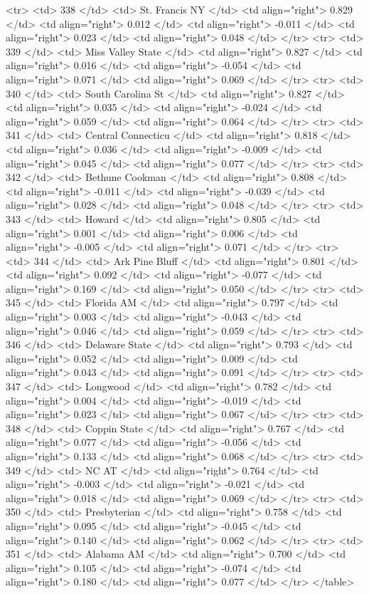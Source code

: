  <tr> <td> 338 </td> <td> St. Francis NY </td> <td align="right"> 0.829 </td> <td align="right"> 0.012 </td> <td align="right"> -0.011 </td> <td align="right"> 0.023 </td> <td align="right"> 0.048 </td> </tr>
  <tr> <td> 339 </td> <td> Miss Valley State </td> <td align="right"> 0.827 </td> <td align="right"> 0.016 </td> <td align="right"> -0.054 </td> <td align="right"> 0.071 </td> <td align="right"> 0.069 </td> </tr>
  <tr> <td> 340 </td> <td> South Carolina St </td> <td align="right"> 0.827 </td> <td align="right"> 0.035 </td> <td align="right"> -0.024 </td> <td align="right"> 0.059 </td> <td align="right"> 0.064 </td> </tr>
  <tr> <td> 341 </td> <td> Central Connecticu </td> <td align="right"> 0.818 </td> <td align="right"> 0.036 </td> <td align="right"> -0.009 </td> <td align="right"> 0.045 </td> <td align="right"> 0.077 </td> </tr>
  <tr> <td> 342 </td> <td> Bethune Cookman </td> <td align="right"> 0.808 </td> <td align="right"> -0.011 </td> <td align="right"> -0.039 </td> <td align="right"> 0.028 </td> <td align="right"> 0.048 </td> </tr>
  <tr> <td> 343 </td> <td> Howard </td> <td align="right"> 0.805 </td> <td align="right"> 0.001 </td> <td align="right"> 0.006 </td> <td align="right"> -0.005 </td> <td align="right"> 0.071 </td> </tr>
  <tr> <td> 344 </td> <td> Ark Pine Bluff </td> <td align="right"> 0.801 </td> <td align="right"> 0.092 </td> <td align="right"> -0.077 </td> <td align="right"> 0.169 </td> <td align="right"> 0.050 </td> </tr>
  <tr> <td> 345 </td> <td> Florida AM </td> <td align="right"> 0.797 </td> <td align="right"> 0.003 </td> <td align="right"> -0.043 </td> <td align="right"> 0.046 </td> <td align="right"> 0.059 </td> </tr>
  <tr> <td> 346 </td> <td> Delaware State </td> <td align="right"> 0.793 </td> <td align="right"> 0.052 </td> <td align="right"> 0.009 </td> <td align="right"> 0.043 </td> <td align="right"> 0.091 </td> </tr>
  <tr> <td> 347 </td> <td> Longwood </td> <td align="right"> 0.782 </td> <td align="right"> 0.004 </td> <td align="right"> -0.019 </td> <td align="right"> 0.023 </td> <td align="right"> 0.067 </td> </tr>
  <tr> <td> 348 </td> <td> Coppin State </td> <td align="right"> 0.767 </td> <td align="right"> 0.077 </td> <td align="right"> -0.056 </td> <td align="right"> 0.133 </td> <td align="right"> 0.068 </td> </tr>
  <tr> <td> 349 </td> <td> NC AT </td> <td align="right"> 0.764 </td> <td align="right"> -0.003 </td> <td align="right"> -0.021 </td> <td align="right"> 0.018 </td> <td align="right"> 0.069 </td> </tr>
  <tr> <td> 350 </td> <td> Presbyterian </td> <td align="right"> 0.758 </td> <td align="right"> 0.095 </td> <td align="right"> -0.045 </td> <td align="right"> 0.140 </td> <td align="right"> 0.062 </td> </tr>
  <tr> <td> 351 </td> <td> Alabama AM </td> <td align="right"> 0.700 </td> <td align="right"> 0.105 </td> <td align="right"> -0.074 </td> <td align="right"> 0.180 </td> <td align="right"> 0.077 </td> </tr>
   </table>
